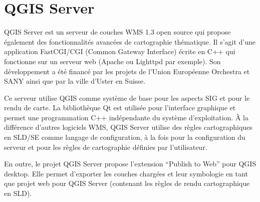 
\chapter{QGIS Server}\label{label_qgisserver}


QGIS Server est un serveur de couches WMS 1.3 open source qui propose également des fonctionnalités avancées de cartographie thématique. Il s'agit d'une application FastCGI/CGI (Common Gateway Interface) écrite en C++ qui fonctionne sur un serveur web (Apache ou Lighttpd par exemple). Son développement a été financé par les projets de l'Union Européenne Orchestra et SANY ainsi que par la ville d'Uster en Suisse.

Ce serveur utilise QGIS comme système de base pour les aspects SIG et pour le rendu de carte. La bibliothèque Qt est utilisée pour l'interface graphique et permet une programmation C++ indépendante du système d'exploitation. À la différence d'autres logiciels WMS, QGIS Server utilise des règles cartographiques en SLD/SE comme langage de configuration, à la fois pour la configuration du serveur et pour les règles de cartographie définies par l'utilisateur.

En outre, le projet QGIS Server propose l'extension “Publish to Web” pour QGIS desktop. Elle permet d'exporter les couches chargées et leur symbologie en tant que projet web pour QGIS Server (contenant les règles de rendu cartographique en SLD).

